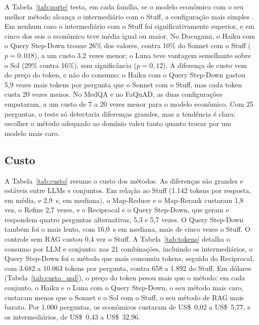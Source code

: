 A Tabela~\ref{tab:porte} testa, em cada família, se o modelo econômico com o seu melhor método alcança o intermediário com o Stuff, a configuração mais simples \cite{chen2023frugalgpt}. Em nenhum caso o intermediário com o Stuff foi significativamente superior, e em cinco dos seis o econômico teve média igual ou maior. No Docugami, o Haiku com o Query Step-Down trouxe 26\% dos valores, contra 10\% do Sonnet com o Stuff ($p = 0{,}018$), a um custo 3,2 vezes menor; o Luna teve vantagem semelhante sobre o Sol (29\% contra 16\%), sem significância ($p = 0{,}12$). A diferença de custo vem do preço do token, e não do consumo: o Haiku com o Query Step-Down gastou 5,9 vezes mais tokens por pergunta que o Sonnet com o Stuff, mas cada token custa 20 vezes menos. No MedQA e no FaQuAD, as duas configurações empataram, a um custo de 7 a 20 vezes menor para o modelo econômico. Com 25 perguntas, o teste só detectaria diferenças grandes, mas a tendência é clara: escolher o método adequado ao domínio valeu tanto quanto trocar por um modelo mais caro.


\subsection{Custo}
\label{ssc:custo}

A Tabela~\ref{tab:custo} resume o custo dos métodos. As diferenças são grandes e estáveis entre LLMs e conjuntos. Em relação ao Stuff (1.142 tokens por resposta, em média, e 2,9~s, em mediana), o Map-Reduce e o Map-Rerank custaram 1,8 vez, o Refine 2,7 vezes, e o Reciprocal e o Query Step-Down, que geram e respondem quatro perguntas alternativas, 5,3 e 5,7 vezes. O Query Step-Down também foi o mais lento, com 16,0~s em mediana, mais de cinco vezes o Stuff. O controle sem RAG custou 0,4 vez o Stuff. A Tabela~\ref{tab:tokens} detalha o consumo por LLM e conjunto: nas 21 combinações, incluindo os intermediários, o Query Step-Down foi o método que mais consumiu tokens, seguido do Reciprocal, com 3.682 a 10.063 tokens por pergunta, contra 658 a 1.892 do Stuff. Em dólares (Tabela~\ref{tab:custo_usd}), o preço do token pesou mais que o método: em cada conjunto, o Haiku e o Luna com o Query Step-Down, o seu método mais caro, custaram menos que o Sonnet e o Sol com o Stuff, o seu método de RAG mais barato. Por 1.000 perguntas, os econômicos custaram de US\$~0,02 a US\$~5,77, e os intermediários, de US\$~0,43 a US\$~32,96.


